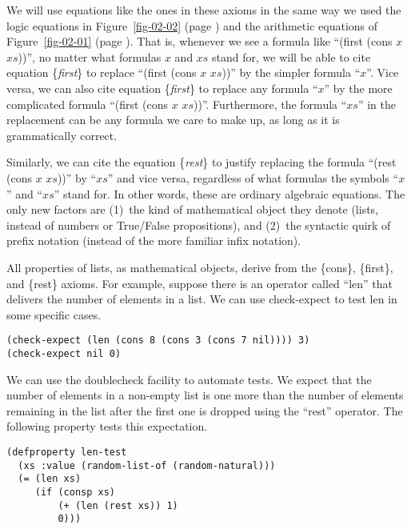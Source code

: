 We will use equations like the ones in these axioms in the 
same way we used the logic equations in Figure~\ref{fig-02-02} 
(page \pageref{fig-02-02}) and the arithmetic equations of 
Figure~\ref{fig-02-01} (page \pageref{fig-02-01}).
That is, whenever we see a formula like ``(first (cons $x$ $xs$))'',
no matter what formulas $x$ and $xs$ stand for, 
we will be able to cite equation \{\emph{first}\} to replace 
``(first (cons $x$ $xs$))'' by the simpler formula ``$x$''. 
Vice versa, we can also cite equation \{\emph{first}\} 
to replace any formula ``$x$'' by the more complicated formula 
``(first (cons $x$ $xs$))''. 
Furthermore, the formula ``$xs$'' in the replacement can be 
any formula we care to make up, as long as it is grammatically correct.

Similarly, we can cite the equation \{\emph{rest}\} to justify 
replacing the formula ``(rest (cons $x$ $xs$))'' by ``$xs$'' 
and vice versa, regardless of what formulas the symbols ``$x$'' and ``$xs$'' stand for. 
In other words, these are ordinary algebraic equations. 
The only new factors are
(1)~the kind of mathematical object they denote (lists, instead of numbers or True/False propositions), and
(2)~the syntactic quirk of prefix notation (instead of the more familiar infix notation).

All properties of lists, as mathematical objects, derive from the \{cons\}, \{first\}, and \{rest\} axioms. 
For example, suppose there is an operator called ``len'' 
that delivers the number of elements in a list. 
We can use check-expect to test len in some specific cases.

\begin{lstlisting}
(check-expect (len (cons 8 (cons 3 (cons 7 nil)))) 3)
(check-expect nil 0)
\end{lstlisting}

We can use the doublecheck facility to automate tests. 
We expect that the number of elements in a non-empty list 
is one more than the number of elements remaining in the list 
after the first one is dropped using the ``rest'' operator. 
The following property tests this expectation.

\begin{lstlisting}
(defproperty len-test
  (xs :value (random-list-of (random-natural)))
  (= (len xs)
     (if (consp xs)
         (+ (len (rest xs)) 1)
         0)))
\end{lstlisting}

